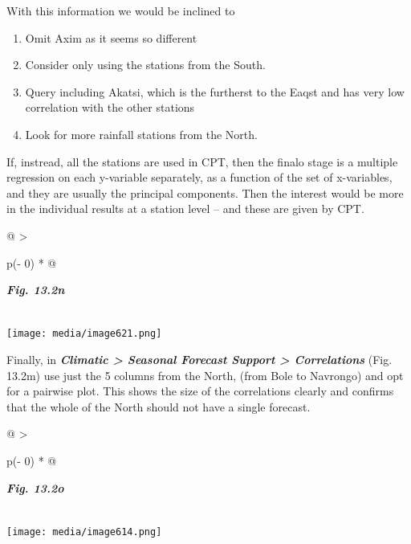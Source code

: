 \documentclass[
  letterpaper,
  DIV=11,
  numbers=noendperiod]{scrreprt}
\begin{document}
With this information we would be inclined to

\begin{enumerate}
\def\labelenumi{\alph{enumi})}
\item
  Omit Axim as it seems so different
\item
  Consider only using the stations from the South.
\item
  Query including Akatsi, which is the furtherst to the Eaqst and has
  very low correlation with the other stations
\item
  Look for more rainfall stations from the North.
\end{enumerate}

If, instread, all the stations are used in CPT, then the finalo stage is
a multiple regression on each y-variable separately, as a function of
the set of x-variables, and they are usually the principal components.
Then the interest would be more in the individual results at a station
level -- and these are given by CPT.

\begin{longtable}[]{@{}
  >{\raggedright\arraybackslash}p{(\columnwidth - 0\tabcolsep) * }@{}}
\toprule\noalign{}
\begin{minipage}[b]{\linewidth}\raggedright
\textbf{\emph{Fig. 13.2n}}
\end{minipage} \\
\midrule\noalign{}
\endhead
\bottomrule\noalign{}
\endlastfoot
\texttt{[image: media/image621.png]} \\
\end{longtable}

Finally, in \textbf{\emph{Climatic \textgreater{} Seasonal Forecast
Support \textgreater{} Correlations}} (Fig. 13.2m) use just the 5
columns from the North, (from Bole to Navrongo) and opt for a pairwise
plot. This shows the size of the correlations clearly and confirms that
the whole of the North should not have a single forecast.

\begin{longtable}[]{@{}
  >{\raggedright\arraybackslash}p{(\columnwidth - 0\tabcolsep) * }@{}}
\toprule\noalign{}
\begin{minipage}[b]{\linewidth}\raggedright
\textbf{\emph{Fig. 13.2o}}
\end{minipage} \\
\midrule\noalign{}
\endhead
\bottomrule\noalign{}
\endlastfoot
\texttt{[image: media/image614.png]} \\
\end{longtable}
\end{document}
